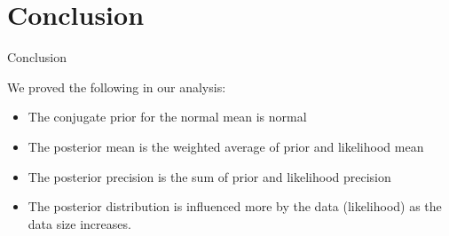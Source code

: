 \section{Conclusion}

\begin{frame}{Conclusion}

  We proved the following in our analysis:

  \begin{itemize}
    \item The conjugate prior for the normal mean is normal
    \item The posterior mean is the weighted average of prior and likelihood mean
    \item The posterior precision is the sum of prior and likelihood precision
    \item The posterior distribution is influenced more by the data (likelihood) as the data size increases.
  \end{itemize}
  
\end{frame}
